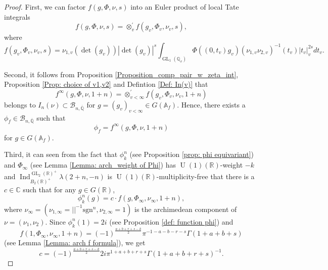 \documentclass[11pt, a4paper]{amsart}
\theoremstyle{plain}
\theoremstyle{definition}
\numberwithin{equation}{section}
\def\AAA{\mathbb{A}}
\def\CC{\mathbb{C}}
\def\QQ{\mathbb{Q}}
\def\RR{\mathbb{R}}
\DeclareMathOperator{\Ind}{Ind}
\DeclareMathOperator{\GL}{\mathrm{GL}}
\DeclareMathOperator{\U}{\mathrm{U}}
\begin{document}
\begin{proof}
    \par First, we can factor $f(g, \Phi, \nu, s)$ into an Euler product of local Tate integrals 
    \begin{equation*}
        f(g, \Phi, \nu, s) = \otimes_{v}^{\prime} f(g_{v}, \Phi_{v}, \nu_{v}, s), 
    \end{equation*}
    where 
    \begin{equation*}
        f(g_{v}, \Phi_{v}, \nu_{v}, s) = \nu_{1, v}(\det(g_{v}))|\det(g_{v})|^{s} \int_{\GL_1(\QQ_{v})} \Phi((0, t_v)g_{v}) (\nu_{1, v}\nu_{2, v})^{-1}(t_v) |t_v|_{v}^{2s} dt_v. 
    \end{equation*}
    \par Second, it follows from Proposition \ref{Proposition_comp_pair_w_zeta_int}, Proposition \ref{Prop: choice of v1,v2} and Defintion \ref{Def: In(v)} that 
         \begin{equation*}
             f^{\infty}(g, \Phi, \nu, 1 + n) = \otimes_{v < \infty}^{\prime} f(g_{v}, \Phi_{v}, \nu_{v}, 1 + n)
         \end{equation*}
         belongs to $I_n(\nu) \subset \mathcal{B}_{n, \overline{\QQ}}$ for $g = (g_{v})_{v < \infty} \in G(\AAA_f)$. Hence, there exists a $\phi_f \in \mathcal{B}_{n, \overline{\QQ}}$ such that 
        \begin{equation*}
            \phi_f = f^{\infty}(g, \Phi, \nu, 1 + n)
        \end{equation*}
        for $g \in G(\AAA_f)$. 
    \par Third, it can seen from the fact that $\phi^{n}_{k}$ (see Proposition \ref{prop: phi equivariant}) and $\Phi_{\infty}$ (see Lemma \ref{Lemma: arch_weight of Phi}) has $\U(1)(\RR)$-weight $-k$ and $\Ind_{B_2(\RR)^{+}}^{\GL_2(\RR)^{+}} \lambda(2 + n, -n)$ is $\U(1)(\RR)$-multiplicity-free that there is a $c \in \CC$ such that for any $g \in G(\RR)$, 
    \begin{equation*}
        \phi^{n}_{k}(g) = c \cdot f(g, \Phi_{\infty}, \nu_{\infty}, 1 + n),
    \end{equation*}
    where $\nu_{\infty} = (\nu_{1, \infty} = ||^{-1}\mathrm{sgn}^{n}, \nu_{2, \infty} = 1)$ is the archimedean component of $\nu = (\nu_1, \nu_2)$. 
    Since $\phi_{k}^{n}(1) = 2i$ (see Proposition \ref{def: function phi}) and
    \begin{equation*}
        f(1, \Phi_{\infty}, \nu_{\infty}, 1+n) = (-1)^{\frac{a + b + r + s - k}{2}} \pi^{-1 -a - b - r - s} \Gamma (1 + a + b + s)
    \end{equation*}
    (see Lemma \ref{Lemma: arch f formula}), 
    we get
    \begin{equation*}
        c = (-1)^{\frac{a + b + r + s - k}{2}} 2i \pi^{1 +a + b + r + s} \Gamma(1 + a + b + r + s)^{-1}. 
    \end{equation*}
\end{proof}
\end{document}
